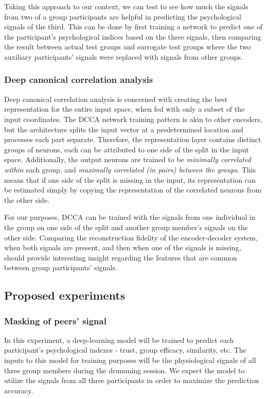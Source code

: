 \documentclass[a4paper, 11pt]{article}      %
\begin{document}
Taking this approach to our context, we can test to see how much the signals from two of a group participants are helpful in predicting the psychological signals of the third. This can be done by first training a network to predict one of the participant's psychological indices based on the three signals, then comparing the result between actual test groups and surrogate test groups where the two auxiliary participants' signals were replaced with signals from other groups.


\subsubsection{Deep canonical correlation analysis}
Deep canonical correlation analysis is concerned with creating the best representation for the entire input space, when fed with only a subset of the input coordinates. The DCCA network training pattern is akin to other encoders, but the architecture splits the input vector at a predetermined location and processes each part separate. Therefore, the representation layer contains distinct groups of neurons, each can be attributed to one side of the split in the input space. Additionally, the output neurons are trained to be \emph{minimally correlated within} each group, and \emph{maximally correlated (in pairs) between the groups}. This means that if one side of the split is missing in the input, its representation can be estimated simply by copying the representation of the correlated neurons from the other side.

For our purposes, DCCA can be trained with the signals from one individual in the group on one side of the split and another group member's signals on the other side. Comparing the reconstruction fidelity of the encoder-decoder system, when both signals are present, and then when one of the signals is missing, should provide interesting insight regarding the features that are common between group participants' signals.


\subsection{Proposed experiments}
\subsubsection{Masking of peers' signal}
In this experiment, a deep-learning model will be trained to predict each participant's psychological indexes - trust, group efficacy, similarity, etc. The inputs to this model for training purposes will be the physiological signals of all three group members during the drumming session. We expect the model to utilize the signals from all three participants in order to maximize the prediction accuracy.
\end{document}
